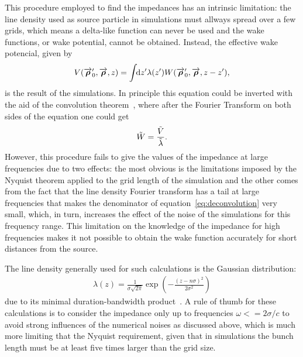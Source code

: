     This procedure employed to find the impedances has an intrinsic limitation: the line density used as source particle in simulations must allways spread over a few grids, which means a delta-like function can never be used and the wake functions, or wake potential, cannot be obtained. Instead, the effective wake potencial, given by
    \begin{align}
        V(\overrightarrow{\boldsymbol{\rho}}'_0, \overrightarrow{\boldsymbol{\rho}}, z) = \int\!\!\text{d}z' 
                \lambda(z') W(\overrightarrow{\boldsymbol{\rho}}'_0,\overrightarrow{\boldsymbol{\rho}},z-z'),
    \end{align}
    is the result of the simulations. In principle this equation could be inverted with the aid of the convolution theorem~\cite{wiki2017a}, where after the Fourier Transform on both sides of the equation one could get
    \begin{align}\label{eq:deconvolution}
        \tilde{W} = \frac{\tilde{V}}{\tilde{\lambda}}.
    \end{align}
    However, this procedure fails to give the values of the impedance at large frequencies due to two effects: the most obvious is the limitations imposed by the Nyquist theorem applied to the grid length of the simulation and the other comes from the fact that the line density Fourier transform has a tail at large frequencies that makes the denominator of equation~\eqref{eq:deconvolution} very small, which, in turn, increases the effect of the noise of the simulations for this frequency range. This limitation on the knowledge of the impedance for high frequencies makes it not possible to obtain the wake function accurately for short distances from the source.

    The line density generally used for such calculations is the Gaussian distribution:
    \begin{align}
        \lambda(z) = \frac{1}{\sigma\sqrt{2\pi}}
        \exp\left(-\frac{(z-n\sigma)^2}{2\sigma^2}\right)
    \end{align}
    due to its minimal duration-bandwidth product~\cite{Niedermayer2016}. A rule of thumb for these calculations is to consider the impedance only up to frequencies $\omega<=2\sigma/c$ to avoid strong influences of the numerical noises as discussed above, which is much more limiting that the Nyquist requirement, given that in simulations the bunch length must be at least five times larger than the grid size.

